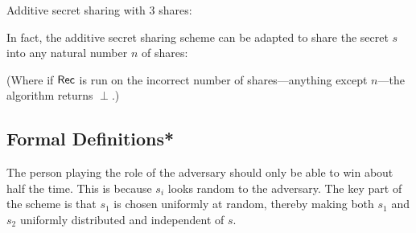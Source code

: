 \begin{answer} Additive secret sharing with 3 shares:
    \begin{pchstack}[center]
    \end{pchstack}

    In fact, the additive secret sharing scheme can be adapted to share 
    the secret $s$ into any natural number $n$ of shares:
    \begin{pchstack}[center]
    \end{pchstack}

    (Where if $\mathsf{Rec}$ is run on the incorrect number of shares---anything except 
    $n$---the algorithm returns $\perp$.)
\end{answer}

\subsection{Formal Definitions*}
\begin{sampleA}
    The person playing the role of the adversary should only be able to win about half the time. This is 
    because $s_i$ looks random to the adversary. The key part of the scheme 
    is that $s_1$ is chosen uniformly at random, thereby making both $s_1$ 
    and $s_2$ uniformly distributed and independent of $s$.
\end{sampleA}

